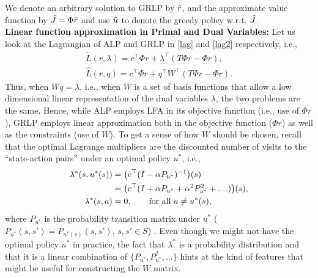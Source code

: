 We denote an arbitrary solution to GRLP by $\hat{r}$, and the approximate value function by $\hat{J}=\Phi \hat{r}$ and use $\hat{u}$ to denote the greedy policy w.r.t. $\hat{J}$.\\
\textbf{Linear function approximation in Primal and Dual Variables:} Let us look at the Lagrangian of ALP and GRLP in
\eqref{lag} and \eqref{lag2} respectively, i.e.,
\begin{align}\label{lag}
\tilde{L}(r,\lambda)=c^\top \Phi r+\lambda^\top (T\Phi r-\Phi r), \\ \label{lag2}\hat{L}(r,q)=c^\top \Phi r+q^\top W^\top (T\Phi r-\Phi r).
\end{align}
Thus, when $Wq = \lambda$, i.e., when $W$ is a set of basis functions that allow
a low dimensional linear representation of the dual variables $\lambda$,
the two problems are the same.
Hence, while ALP employs LFA in its objective function (i.e., use of $\Phi r$), GRLP employs linear approximation both in the objective function ($\Phi r$) as well as the constraints (use of $W$).
To get a sense of how $W$ should be chosen, recall that
the optimal Lagrange multipliers are the discounted number of visits to the ``state-action pairs'' under an optimal policy $u^*$, i.e.,
\begin{align}
\lambda^*(s,u^*(s))&=\big(c^\top(I-\alpha P_{u^*})^{-1}\big)(s)\nonumber\\
&= \big(c^\top(I+\alpha P_{u^*}+\alpha^2 P_{u^*}^2+\ldots)\big)(s),\nonumber\\
\lambda^*(s,a)&=0, \qquad \text{for all } a \neq u^*(s),\nonumber
\end{align}
where $P_{u^*}$ is the probability transition matrix under $u^*$ ($P_{u^*}(s,s') = P_{u^*(s)}(s,s')$, $s,s'\in S$) \cite{dolgov}. Even though we might not have the optimal policy $u^*$ in practice, the fact that $\lambda^*$ is a probability distribution and that it is a linear combination of $\{P_{u^*},P^2_{u^*},\ldots\}$ hints at the kind of features that might be useful for constructing the $W$ matrix.
\fi
